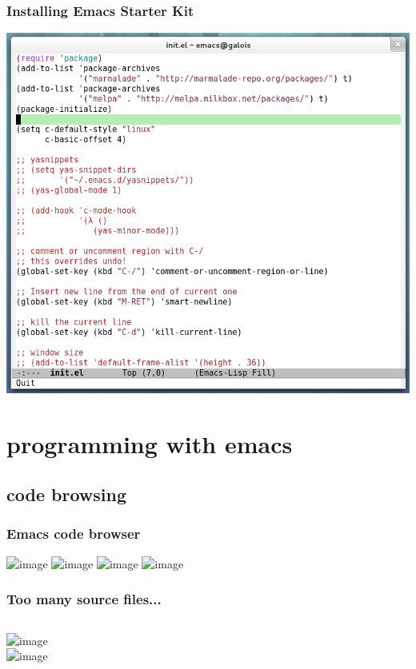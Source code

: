 \documentclass{beamer}
\begin{document}
\begin{frame}
\frametitle{Installing Emacs Starter Kit}
\centering
\includegraphics[height=0.8\textheight]{images/emacs_starter_kit.png}
\end{frame}

\section{programming with emacs}

\subsection{code browsing}

\begin{frame}
\frametitle{Emacs code browser}
\centering
\includegraphics<1>[height=0.8\textheight]{images/ecb_default_view.png}
\includegraphics<2>[height=0.8\textheight]{images/ecb_dir.png}
\includegraphics<3>[height=0.8\textheight]{images/ecb_src.png}
\includegraphics<4>[height=0.8\textheight]{images/ecb_methods.png}
\end{frame}

\begin{frame}
\frametitle{Too many source files...}
\begin{columns}[T]
\column{5cm}
\includegraphics<1->[width=\textwidth]{images/ecb_many_files.png}\\
\column{5cm}
\includegraphics<3->[width=\textwidth]{images/ecb_file_search.png}
\end{columns}
\end{frame}
\end{document}
